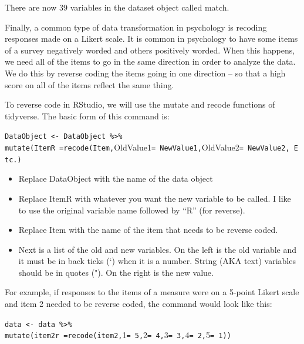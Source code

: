 \documentclass[
]{book}
\providecommand{\tightlist}{%
  \setlength{\itemsep}{0pt}\setlength{\parskip}{0pt}}
\begin{document}
There are now 39 variables in the dataset object called match.

Finally, a common type of data transformation in psychology is recoding responses made on a Likert scale. It is common in psychology to have some items of a survey negatively worded and others positively worded. When this happens, we need all of the items to go in the same direction in order to analyze the data. We do this by reverse coding the items going in one direction -- so that a high score on all of the items reflect the same thing.

To reverse code in RStudio, we will use the mutate and recode functions of tidyverse. The basic form of this command is:

\texttt{DataObject\ \textless{}-\ DataObject\ \%\textgreater{}\%}\\
\texttt{mutate(ItemR\ =recode(Item,}OldValue1\texttt{=\ NewValue1,}OldValue2\texttt{=\ NewValue2,\ Etc.)}

\begin{itemize}
\tightlist
\item
  Replace DataObject with the name of the data object\\
\item
  Replace ItemR with whatever you want the new variable to be called. I like to use the original variable name followed by ``R'' (for reverse).\\
\item
  Replace Item with the name of the item that needs to be reverse coded.\\
\item
  Next is a list of the old and new variables. On the left is the old variable and it must be in back ticks (`) when it is a number. String (AKA text) variables should be in quotes ("). On the right is the new value.
\end{itemize}

For example, if responses to the items of a measure were on a 5-point Likert scale and item 2 needed to be reverse coded, the command would look like this:

\texttt{data\ \textless{}-\ data\ \%\textgreater{}\%}\\
\texttt{mutate(item2r\ =recode(item2,}1\texttt{=\ 5,}2\texttt{=\ 4,}3\texttt{=\ 3,}4\texttt{=\ 2,}5\texttt{=\ 1))}
\end{document}
